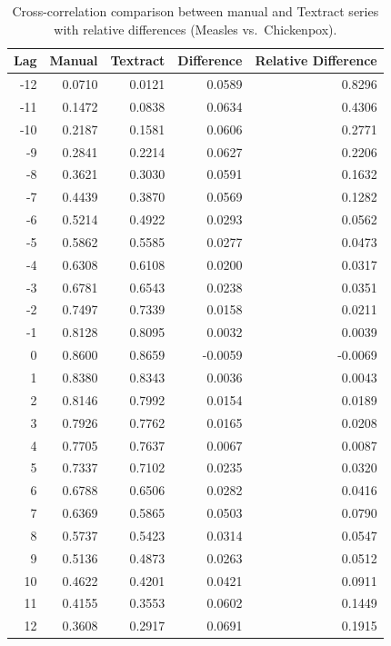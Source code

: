 \documentclass[12pt]{article}
\begin{document}
\begin{table}[h]
\centering
\begin{tabular}{rrrrr}
\toprule
Lag & Manual & Textract & Difference & Relative Difference \\
\midrule
-12 & 0.0710 & 0.0121 & 0.0589 & 0.8296 \\
-11 & 0.1472 & 0.0838 & 0.0634 & 0.4306 \\
-10 & 0.2187 & 0.1581 & 0.0606 & 0.2771 \\
 -9 & 0.2841 & 0.2214 & 0.0627 & 0.2206 \\
 -8 & 0.3621 & 0.3030 & 0.0591 & 0.1632 \\
 -7 & 0.4439 & 0.3870 & 0.0569 & 0.1282 \\
 -6 & 0.5214 & 0.4922 & 0.0293 & 0.0562 \\
 -5 & 0.5862 & 0.5585 & 0.0277 & 0.0473 \\
 -4 & 0.6308 & 0.6108 & 0.0200 & 0.0317 \\
 -3 & 0.6781 & 0.6543 & 0.0238 & 0.0351 \\
 -2 & 0.7497 & 0.7339 & 0.0158 & 0.0211 \\
 -1 & 0.8128 & 0.8095 & 0.0032 & 0.0039 \\
  0 & 0.8600 & 0.8659 & -0.0059 & -0.0069 \\
  1 & 0.8380 & 0.8343 & 0.0036 & 0.0043 \\
  2 & 0.8146 & 0.7992 & 0.0154 & 0.0189 \\
  3 & 0.7926 & 0.7762 & 0.0165 & 0.0208 \\
  4 & 0.7705 & 0.7637 & 0.0067 & 0.0087 \\
  5 & 0.7337 & 0.7102 & 0.0235 & 0.0320 \\
  6 & 0.6788 & 0.6506 & 0.0282 & 0.0416 \\
  7 & 0.6369 & 0.5865 & 0.0503 & 0.0790 \\
  8 & 0.5737 & 0.5423 & 0.0314 & 0.0547 \\
  9 & 0.5136 & 0.4873 & 0.0263 & 0.0512 \\
 10 & 0.4622 & 0.4201 & 0.0421 & 0.0911 \\
 11 & 0.4155 & 0.3553 & 0.0602 & 0.1449 \\
 12 & 0.3608 & 0.2917 & 0.0691 & 0.1915 \\
\bottomrule
\end{tabular}
\caption{Cross-correlation comparison between manual and Textract series with relative differences (Measles vs.\ Chickenpox).}
\label{table:ccdif}
\end{table}
\end{document}
